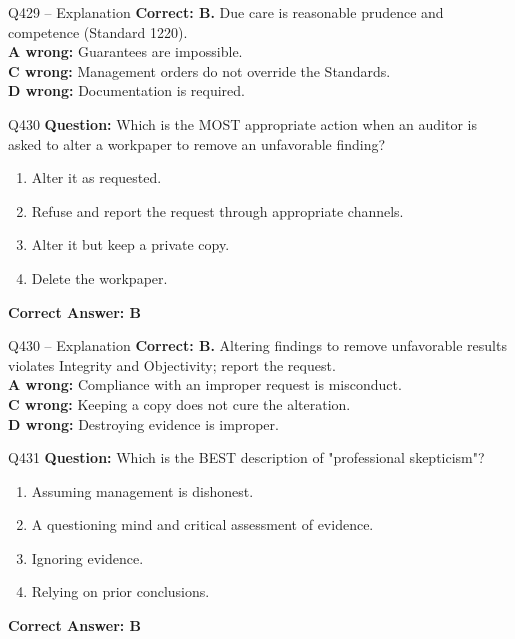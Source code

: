 \documentclass[aspectratio=169,10pt]{beamer}
\begin{document}
	\begin{frame}[t]{Q429 -- Explanation}
		\small
		\textbf{Correct: B.} Due care is reasonable prudence and competence (Standard 1220). \\[4pt]
		\textbf{A wrong:} Guarantees are impossible. \\[2pt]
		\textbf{C wrong:} Management orders do not override the Standards. \\[2pt]
		\textbf{D wrong:} Documentation is required.
	\end{frame}
	
	\begin{frame}[t]{Q430}
		\small
		\textbf{Question:} Which is the MOST appropriate action when an auditor is asked to alter a workpaper to remove an unfavorable finding?
		\begin{enumerate}[label=\Alph*.,itemsep=1pt,topsep=2pt]
			\item Alter it as requested.
			\item Refuse and report the request through appropriate channels.
			\item Alter it but keep a private copy.
			\item Delete the workpaper.
		\end{enumerate}
		\vspace{4pt}
		\textbf{Correct Answer: B}
	\end{frame}
	
	\begin{frame}[t]{Q430 -- Explanation}
		\small
		\textbf{Correct: B.} Altering findings to remove unfavorable results violates Integrity and Objectivity; report the request. \\[4pt]
		\textbf{A wrong:} Compliance with an improper request is misconduct. \\[2pt]
		\textbf{C wrong:} Keeping a copy does not cure the alteration. \\[2pt]
		\textbf{D wrong:} Destroying evidence is improper.
	\end{frame}
	
	\begin{frame}[t]{Q431}
		\small
		\textbf{Question:} Which is the BEST description of "professional skepticism"?
		\begin{enumerate}[label=\Alph*.,itemsep=1pt,topsep=2pt]
			\item Assuming management is dishonest.
			\item A questioning mind and critical assessment of evidence.
			\item Ignoring evidence.
			\item Relying on prior conclusions.
		\end{enumerate}
		\vspace{4pt}
		\textbf{Correct Answer: B}
	\end{frame}
	
\end{document}
